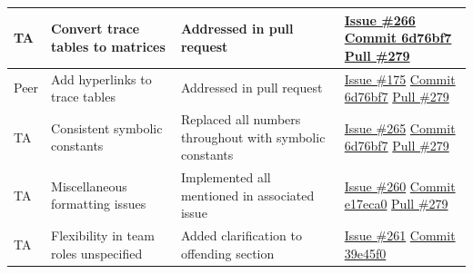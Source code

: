 \documentclass[12pt, titlepage]{article}
\begin{document}
\begin{longtable}{|p{2cm}|p{4cm}|p{5cm}|p{3cm}|}
TA & Convert trace tables to matrices & Addressed in pull request & \href{https://github.com/OmarHassanAdelhamid/Five-of-a-Kind-capstone-project-/issues/266}{Issue \#266}
\newline\href{https://github.com/OmarHassanAdelhamid/Five-of-a-Kind-capstone-project-/pull/279/commits/6d76bf7355cf75f9e93c357bc26317ad184882ce}{Commit 6d76bf7}
\newline\href{https://github.com/OmarHassanAdelhamid/Five-of-a-Kind-capstone-project-/pull/279}{Pull \#279} \\ \hline
Peer & Add hyperlinks to trace tables & Addressed in pull request & \href{https://github.com/OmarHassanAdelhamid/Five-of-a-Kind-capstone-project-/issues/175}{Issue \#175}
\newline\href{https://github.com/OmarHassanAdelhamid/Five-of-a-Kind-capstone-project-/pull/279/commits/6d76bf7355cf75f9e93c357bc26317ad184882ce}{Commit 6d76bf7}
\newline\href{https://github.com/OmarHassanAdelhamid/Five-of-a-Kind-capstone-project-/pull/279}{Pull \#279} \\ \hline
TA & Consistent symbolic constants & Replaced all numbers throughout with symbolic constants & \href{https://github.com/OmarHassanAdelhamid/Five-of-a-Kind-capstone-project-/issues/265}{Issue \#265}
\newline\href{https://github.com/OmarHassanAdelhamid/Five-of-a-Kind-capstone-project-/pull/279/commits/6d76bf7355cf75f9e93c357bc26317ad184882ce}{Commit 6d76bf7}
\newline\href{https://github.com/OmarHassanAdelhamid/Five-of-a-Kind-capstone-project-/pull/279}{Pull \#279} \\ \hline
TA & Miscellaneous formatting issues & Implemented all mentioned in associated issue & \href{https://github.com/OmarHassanAdelhamid/Five-of-a-Kind-capstone-project-/issues/260}{Issue \#260}
\newline\href{https://github.com/OmarHassanAdelhamid/Five-of-a-Kind-capstone-project-/pull/279/commits/e17eca0087535efb0654f72a1007031ee95a9c22}{Commit e17eca0}
\newline\href{https://github.com/OmarHassanAdelhamid/Five-of-a-Kind-capstone-project-/pull/279}{Pull \#279} \\ \hline
TA & Flexibility in team roles unspecified & Added clarification to offending section & \href{https://github.com/OmarHassanAdelhamid/Five-of-a-Kind-capstone-project-/issues/261}{Issue \#261}
\newline\href{https://github.com/OmarHassanAdelhamid/Five-of-a-Kind-capstone-project-/pull/279/commits/39e45f0ffa825d9664234e5ee6788fce38648f07}{Commit 39e45f0}

\end{longtable}
\end{document}
